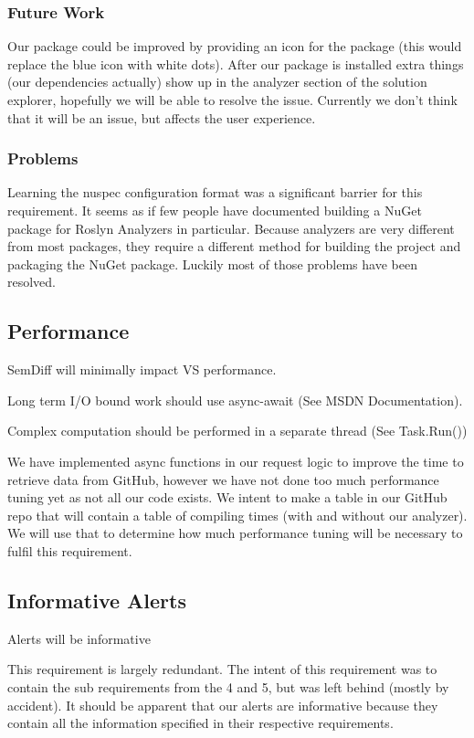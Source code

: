 \documentclass[10pt,draftclsnofoot,onecolumn]{IEEEtran}
\begin{document}
\subsubsection{Future Work}
Our package could be improved by providing an icon for the package (this would replace the blue icon with white dots). After our package is installed extra things (our dependencies actually) show up in the analyzer section of the solution explorer, hopefully we will be able to resolve the issue. Currently we don’t think that it will be an issue, but affects the user experience.

\subsubsection{Problems}
Learning the nuspec configuration format was a significant barrier for this requirement. It seems as if few people have documented building a NuGet package for Roslyn Analyzers in particular. Because analyzers are very different from most packages, they require a different method for building the project and packaging the NuGet package. Luckily most of those problems have been resolved.

\subsection{Performance}
SemDiff will minimally impact VS performance.

Long term I/O bound work should use async-await (See MSDN Documentation).

Complex computation should be performed in a separate thread (See Task.Run())

We have implemented async functions in our request logic to improve the time to retrieve data from GitHub, however we have not done too much performance tuning yet as not all our code exists. We intent to make a table in our GitHub repo that will contain a table of compiling times (with and without our analyzer). We will use that to determine how much performance tuning will be necessary to fulfil this requirement.

\subsection{Informative Alerts}
Alerts will be informative

This requirement is largely redundant. The intent of this requirement was to contain the sub requirements from the 4 and 5, but was left behind (mostly by accident). It should be apparent that our alerts are informative because they contain all the information specified in their respective requirements.
\end{document}
